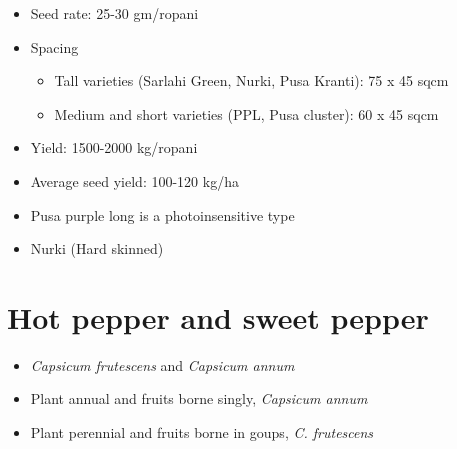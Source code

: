 \documentclass[
  ignorenonframetext,
  aspectratio=169]{beamer}
\providecommand{\tightlist}{%
  \setlength{\itemsep}{0pt}\setlength{\parskip}{0pt}}
\begin{document}
\begin{frame}{}
\protect\hypertarget{section-8}{}
\begin{itemize}
\tightlist
\item
  Seed rate: 25-30 gm/ropani
\item
  Spacing

  \begin{itemize}
  \tightlist
  \item
    Tall varieties (Sarlahi Green, Nurki, Pusa Kranti): 75 x 45 sqcm
  \item
    Medium and short varieties (PPL, Pusa cluster): 60 x 45 sqcm
  \end{itemize}
\end{itemize}
\end{frame}

\begin{frame}{}
\protect\hypertarget{section-9}{}
\begin{itemize}
\tightlist
\item
  Yield: 1500-2000 kg/ropani
\end{itemize}
\end{frame}

\begin{frame}{}
\protect\hypertarget{section-10}{}
\begin{itemize}
\tightlist
\item
  Average seed yield: 100-120 kg/ha
\end{itemize}
\end{frame}

\begin{frame}{}
\protect\hypertarget{section-11}{}
\begin{itemize}
\tightlist
\item
  Pusa purple long is a photoinsensitive type
\item
  Nurki (Hard skinned)
\end{itemize}
\end{frame}

\hypertarget{hot-pepper-and-sweet-pepper}{%
\section{Hot pepper and sweet
pepper}\label{hot-pepper-and-sweet-pepper}}

\begin{frame}{}
\protect\hypertarget{section-12}{}
\begin{itemize}
\tightlist
\item
  \emph{Capsicum frutescens} and \emph{Capsicum annum}
\item
  Plant annual and fruits borne singly, \emph{Capsicum annum}
\item
  Plant perennial and fruits borne in goups, \emph{C. frutescens}
\end{itemize}
\end{frame}
\end{document}
